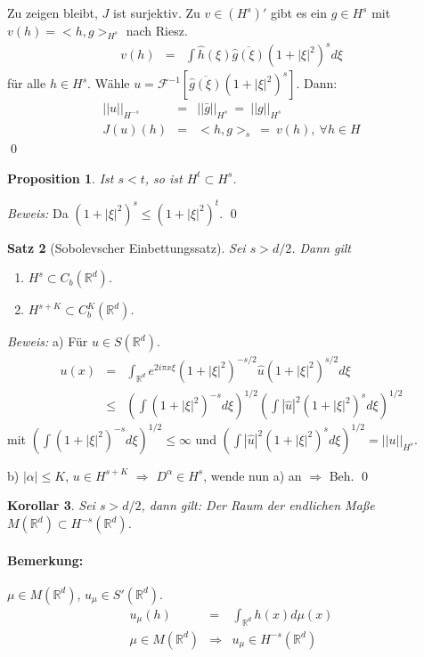 \documentclass[12pt]{extreport} %
\newtheorem{Satz}{Satz}[subsection]
\newtheorem{Prop}[Satz]{Proposition}
\newtheorem{Korollar}[Satz]{Korollar}
\numberwithin{equation}{section}
\newcommand{\R}{\mathbb{R}} %
\newcommand{\g}{\hat{g}}
\newcommand{\F}{\mathcal{F}}
\newcommand{\Bew}{\emph{Beweis: }}
\begin{document}
	Zu zeigen bleibt, $J$ ist surjektiv. Zu $v\in(H^s)'$ gibt es ein $g\in H^s$ mit $v(h) = <h,g>_{H^s}$ nach Riesz.
	\begin{eqnarray}
		v(h) &=& \int \hat h(\xi)\overline{\g(\xi)} (1+|\xi|^2)^s d\xi\nonumber
	\end{eqnarray}
	für alle $h\in H^s$. Wähle $u=\F^{-1}[\overline{\g(\xi)}(1+|\xi|^2)^{s}]$. Dann:
	\begin{eqnarray}
		||u||_{H^{-s}} &=& ||\bar g||_{H^s} ~=~ ||g||_{H^s}\nonumber\\
		J(u)(h) &=& <h,g>_{s}~=~ v(h),~\forall h\in H\nonumber
	\end{eqnarray}
	\qed
	
	\begin{Prop}
		Ist $s<t$, so ist $H^t\subset H^s$.
	\end{Prop}
	
	\Bew Da $(1+|\xi|^2)^s\leq (1+|\xi|^2)^t$.
	\qed
	
	\begin{Satz}[Sobolevscher Einbettungssatz]
		Sei $s>d/2$. Dann gilt
		\begin{enumerate}
			\item[a)] $H^s\subset C_b(\R^d)$.
			\item[b)] $H^{s+K}\subset C_b^K(\R^d)$.
		\end{enumerate}
	\end{Satz}
	
	\Bew a) Für $u\in S(\R^d)$. 
	\begin{eqnarray}
		u(x) &=& \int_{\R^d} e^{2i\pi x\xi}(1+|\xi|^2)^{-s/2} \hat u(1+|\xi|^2)^{s/2} d\xi\nonumber\\
		&\leq& \left(\int (1+|\xi|^2)^{-s}d\xi \right)^{1/2} \left(\int |\hat u|^2 (1+|\xi|^2)^sd\xi \right)^{1/2}\nonumber 
	\end{eqnarray}
	mit $\left(\int (1+|\xi|^2)^{-s}d\xi \right)^{1/2}\leq \infty$ und $\left(\int |\hat u|^2 (1+|\xi|^2)^sd\xi \right)^{1/2} = ||u||_{H^s}$. 
	
	b) $|\alpha|\leq K$, $u\in H^{s+K}$ $\Rightarrow$ $D^\alpha\in H^s$, wende nun a) an $\Rightarrow$ Beh.
	\qed
	
	\begin{Korollar}
		Sei $s>d/2$, dann gilt: Der Raum der endlichen Maße $M(\R^d)\subset H^{-s}(\R^d)$.
	\end{Korollar}
	
	\paragraph{Bemerkung:} $\mu\in M(\R^d)$, $u_\mu\in S'(\R^d)$.
	\begin{eqnarray}
		u_\mu(h) &=& \int_{\R^d}h(x)d\mu(x)\nonumber\\
		\mu\in M(\R^d) &\Rightarrow& u_\mu \in H^{-s}(\R^d)\nonumber
	\end{eqnarray}
	
\end{document}
